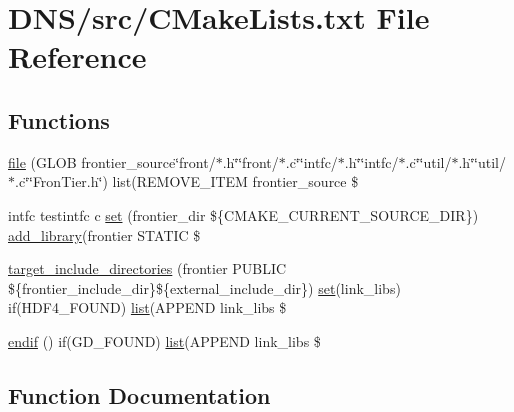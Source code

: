 \hypertarget{src_2_c_make_lists_8txt}{}\section{D\+N\+S/src/\+C\+Make\+Lists.txt File Reference}
\label{src_2_c_make_lists_8txt}
\subsection*{Functions}
\begin{DoxyCompactItemize}
\item 
\hyperlink{src_2_c_make_lists_8txt_ad3991a11c9e0af528624ad3c5649fbeb}{file} (G\+L\+OB frontier\+\_\+source\char`\"{}front/$\ast$.h\char`\"{}\char`\"{}front/$\ast$.c\char`\"{}\char`\"{}intfc/$\ast$.h\char`\"{}\char`\"{}intfc/$\ast$.c\char`\"{}\char`\"{}util/$\ast$.h\char`\"{}\char`\"{}util/$\ast$.c\char`\"{}\char`\"{}Fron\+Tier.\+h\char`\"{}) list(R\+E\+M\+O\+V\+E\+\_\+\+I\+T\+EM frontier\+\_\+source \$
\item 
intfc testintfc c \hyperlink{src_2_c_make_lists_8txt_a1f7c8e71ec60358e07581ba9cdd732b2}{set} (frontier\+\_\+dir \$\{C\+M\+A\+K\+E\+\_\+\+C\+U\+R\+R\+E\+N\+T\+\_\+\+S\+O\+U\+R\+C\+E\+\_\+\+D\+IR\}) \hyperlink{i_fluid_2_c_make_lists_8txt_adc101f35a2c2c58882e7f4af98f599a5}{add\+\_\+library}(frontier S\+T\+A\+T\+IC \$
\item 
\hyperlink{src_2_c_make_lists_8txt_a2e1c33df697410b7bcdbd2f39c8417e5}{target\+\_\+include\+\_\+directories} (frontier P\+U\+B\+L\+IC \$\{frontier\+\_\+include\+\_\+dir\}\$\{external\+\_\+include\+\_\+dir\}) \hyperlink{src_2_c_make_lists_8txt_a1f7c8e71ec60358e07581ba9cdd732b2}{set}(link\+\_\+libs) if(H\+D\+F4\+\_\+\+F\+O\+U\+ND) \hyperlink{climate_2_c_make_lists_8txt_a30dc08d289bd92b4ef9fcbaeea9460c2}{list}(A\+P\+P\+E\+ND link\+\_\+libs \$
\item 
\hyperlink{src_2_c_make_lists_8txt_aef342c7d9b2e3710bae20e89a22eca4e}{endif} () if(G\+D\+\_\+\+F\+O\+U\+ND) \hyperlink{climate_2_c_make_lists_8txt_a30dc08d289bd92b4ef9fcbaeea9460c2}{list}(A\+P\+P\+E\+ND link\+\_\+libs \$
\end{DoxyCompactItemize}


\subsection{Function Documentation}

